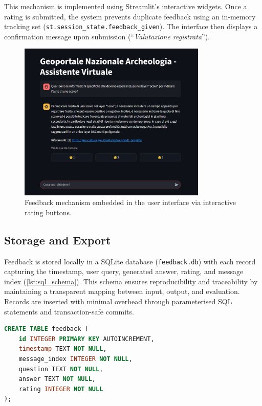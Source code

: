 \begin{spacing}{1.5}
This mechanism is implemented using Streamlit’s interactive widgets. Once a rating is submitted, the system prevents duplicate feedback using an in-memory tracking set (\texttt{st.session\_state.feedback\_given}). The interface then displays a confirmation message upon submission (``\textit{Valutazione registrata}'').

\begin{figure}[H]
  \centering
  \includegraphics[width=0.8\textwidth]{images/ui_ratings.png} 
  \caption{Feedback mechanism embedded in the user interface via interactive rating buttons.}
  \label{fig:ratings}
\end{figure}

\subsection{Storage and Export}
Feedback is stored locally in a SQLite \citep{team_sqlitesqlite_2025} database (\texttt{feedback.db}) with each record capturing the timestamp, user query, generated answer, rating, and message index (\autoref{lst:sql_schema}). This schema ensures reproducibility and traceability by maintaining a transparent mapping between input, output, and evaluation. Records are inserted with minimal overhead through parameterised SQL statements and transaction-safe commits.

\vspace{0.5em}
\begin{lstlisting}[language=SQL,
                  frame=none,
                   caption={SQL schema of the feedback database.},
                   captionpos=b,
                   label={lst:sql_schema},
  xleftmargin=0.2\textwidth,
  xrightmargin=0.1\textwidth]
CREATE TABLE feedback (
    id INTEGER PRIMARY KEY AUTOINCREMENT,
    timestamp TEXT NOT NULL,
    message_index INTEGER NOT NULL,
    question TEXT NOT NULL,
    answer TEXT NOT NULL,
    rating INTEGER NOT NULL
);
\end{lstlisting}


\end{spacing}
